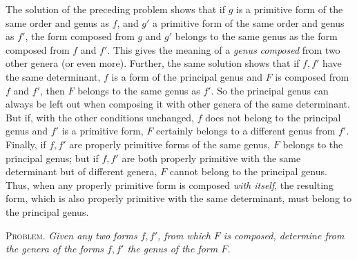 The solution of the preceding problem shows that if $g$ is a primitive form of the same order and genus as $f$, and $g'$ a primitive form of the same order and genus as $f'$, the form composed from $g$ and $g'$ belongs to the same genus as the form composed from $f$ and $f'$. This gives the meaning of a \textit{genus}
\textit{composed} from two other genera (or even more). Further, the same solution shows that if $f,f'$ have the same determinant, $f$ is a form of the principal genus and $F$ is composed from $f$ and $f'$, then $F$ belongs to the same genus as $f'$. So the principal genus can always be left out when composing it with other genera of the same determinant. But if, with the other conditions unchanged, $f$ does not belong to the principal genus and $f'$ is a primitive form, $F$ certainly belongs to a different genus from $f'$. Finally, if $f,f'$ are properly primitive forms of the same genus, $F$ belongs to the principal genus; but if $f,f'$ are both properly primitive with the same determinant but of different genera, $F$ cannot belong to the principal genus. Thus, when any properly primitive form is composed \textit{with itself}, the resulting form, which is also properly primitive with the same determinant, must belong to the principal genus.

\textsc{Problem.} \textit{Given any two forms $f,f'$, from which $F$ is composed, determine from the genera of the forms $f,f'$ the genus of the form $F$.}

